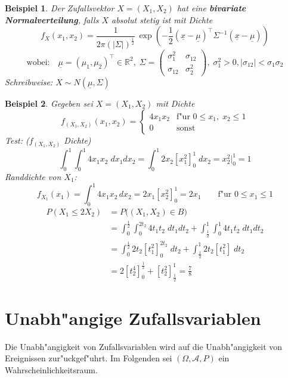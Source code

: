 \documentclass[a4paper,11pt]{book}
\newcommand{\R}{{\mathbb R}}
\def\AA{ \mathcal{A} }
\newtheorem{Bsp}{Beispiel}[chapter]
\theoremstyle{nonumberplain}
\begin{document}
\begin{Bsp}
Der Zufallsvektor $X=(X_1,X_2)$ hat eine \textbf{bivariate Normalverteilung}, falls $X$ absolut stetig ist mit Dichte
\[f_X(x_1,x_2)=\frac{1}{2\pi(|\Sigma |)^{\frac{1}{2}}}\, \exp\left(-\frac{1}{2}(\underline{x}-\underline{\mu})^\top \Sigma^{-1}(\underline{x}-\underline{\mu})\right)\]
\[\text{wobei:}\quad \underline{\mu}=(\mu_1,\mu_2)^\top \in \R^2, \; \Sigma = 
\begin{pmatrix}
\sigma_1^2 & \sigma_{12} \\
\sigma_{12}  & \sigma_2^2
\end{pmatrix}
,\; \sigma_1^2>0, |\sigma_{12}|<\sigma_1 \sigma_2\]
Schreibweise: $X\sim N(\underline{\mu},\Sigma )$
\end{Bsp}

\begin{Bsp}
\label{bsp:8.3}
Gegeben sei $X=(X_1,X_2)$ mit Dichte
\[f_{(X_1,X_2)}(x_1,x_2)=\begin{cases}4x_1x_2 & \text{f"ur } 0\leq x_1,\;x_2\leq 1 \\0 & \text{sonst}\end{cases}\]
Test: ($f_{(X_1,X_2)}$ Dichte)\\
\[\int_0^1\int_0^1 4x_1x_2\;dx_1dx_2=\int_0^1 2x_2\left[x_1^2\right]_0^1\;dx_2=x_2^2\Bigr|_0^1=1\]
Randdichte von $X_1$:\\
\[f_{X_1}(x_1)=\int_0^1 4x_1x_2\,dx_2=2x_1\left[x_2^2\right]_0^1=2x_1
\qquad \text{f"ur } 0\leq x_1\leq 1\]
\begin{align*}
P(X_1\leq 2X_2)&=P\bigl((X_1,X_2)\in B\bigr)\\
&=\int_0^{\frac{1}{2}}\int_0^{2t_2}4t_1t_2\;dt_1dt_2+\int_{\frac{1}{2}}^1\int_0^1 4t_1t_2\;dt_1dt_2\\
&=\int_0^{\frac{1}{2}}2t_2\left[t_1^2\right]_0^{2t_2}\;dt_2 + \int_{\frac{1}{2}}^1 2t_2\left[t_1^2\right]\;dt_2\\
&= 2\left[t_2^4\right]_0^{\frac{1}{2}} + \left[t_2^2\right]_{\frac{1}{2}}^1 = \frac{7}{8}\end{align*}
\end{Bsp}


\chapter{Unabh"angige Zufallsvariablen}
Die Unabh"angigkeit von Zufallsvariablen wird auf die Unabh"angigkeit von Ereignissen zur"uckgef"uhrt. Im Folgenden sei $(\Omega,\AA,P)$ ein Wahrscheinlichkeitsraum.
\end{document}
